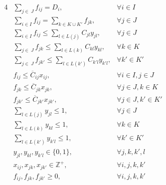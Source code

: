 \documentclass[mscthesis, 11pt]{usiinfthesis}
\theoremstyle{newdefinition}
\begin{document}
\begin{alignat}{4}
& \sum_{j \in \: J} f_{ij}  = D_i, &  \forall i \in I \label{outflow} \\
& \sum_{i \in  I} f_{ij}  = \sum_{k \in K \cup K'} f_{jk}, &  \forall j \in J \label{flow_balance} \\
& \sum_{i \in I} f_{ij} \leq \sum_{l \in L(j)} C_{jl} y_{jl}, &  \forall j \in J \label{size_dependent_j} \\
& \sum_{j \in \: J} f_{jk} \leq \sum_{l \in L(k)} C_{kl} y_{kl}, &  \forall k \in K \label{size_dependent_k} \\
& \sum_{j \in \: J} f_{jk'} \leq \sum_{l \in L(k')} C_{k'l} y_{k'l}, &  \forall k' \in K' \label{size_dependent_k_prime} \\
& f_{ij} \leq \overline{C}_{ij} x_{ij}, &  \forall i \in I, j \in J \label{transportation_capacity_ij} \\
& f_{jk} \leq \overline{C}_{jk} x_{jk}, &  \forall j \in J, k \in K \label{transportation_capacity_jk} \\
& f_{jk'} \leq \overline{C}_{jk'} x_{jk'}, &  \forall j \in J, k' \in K' \label{transportation_capacity_jk_prime} \\
& \sum_{l \in L(j)} y_{jl} \leq 1, &  \forall j \in J \label{one_size_j} \\
& \sum_{l \in L(k)} y_{kl} \leq 1, &  \forall k \in K \label{one_size_k} \\
& \sum_{l \in L(k')} y_{k'l} \leq 1, &  \forall k' \in K' \label{one_size_k_prime} \\
& y_{jl}, y_{kl}, y_{k'l} \in \{0,1\}, &  \forall j, k, k', l \label{y_domains} \\
& x_{ij}, x_{jk}, x_{jk'} \in \mathbb{Z}^{+}, &   \forall i, j, k, k' \label{x_domains} \\
& f_{ij}, f_{jk}, f_{jk'} \geq 0, &  \forall i, j, k, k' \label{f_domains}
\end{alignat}
\end{document}
